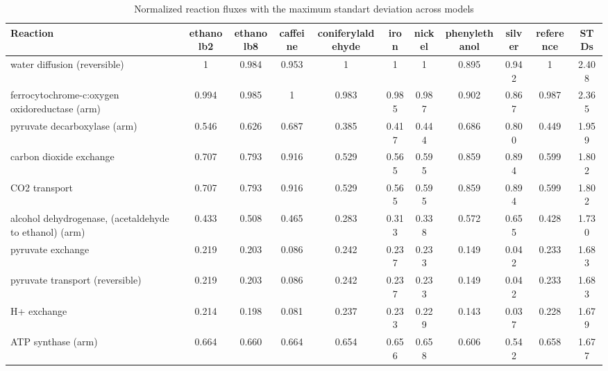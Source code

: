 \begin{longtable}{|l|c|c|c|c|c|c|c|c|c|c|}
    \caption[Common upregulated and downregulated genes]{Normalized reaction fluxes with the maximum standart deviation across models}
\hline
Reaction                                                   & ethanolb2 & ethanolb8 & caffeine & coniferylaldehyde & iron  & nickel & phenylethanol & silver & reference & STDs  \\ \hline
\endhead
%
water diffusion (reversible)                               & 1         & 0.984     & 0.953    & 1                 & 1     & 1      & 0.895         & 0.942  & 1        & 2.408 \\ \hline
ferrocytochrome-c:oxygen oxidoreductase (arm)              & 0.994     & 0.985     & 1        & 0.983             & 0.985 & 0.987  & 0.902         & 0.867  & 0.987    & 2.365 \\ \hline
pyruvate decarboxylase (arm)                               & 0.546     & 0.626     & 0.687    & 0.385             & 0.417 & 0.444  & 0.686         & 0.800  & 0.449    & 1.959 \\ \hline
carbon dioxide exchange                                    & 0.707     & 0.793     & 0.916    & 0.529             & 0.565 & 0.595  & 0.859         & 0.894  & 0.599    & 1.802 \\ \hline
CO2 transport                                              & 0.707     & 0.793     & 0.916    & 0.529             & 0.565 & 0.595  & 0.859         & 0.894  & 0.599    & 1.802 \\ \hline
alcohol dehydrogenase, (acetaldehyde to ethanol) (arm)     & 0.433     & 0.508     & 0.465    & 0.283             & 0.313 & 0.338  & 0.572         & 0.655  & 0.428    & 1.730 \\ \hline
pyruvate exchange                                          & 0.219     & 0.203     & 0.086    & 0.242             & 0.237 & 0.233  & 0.149         & 0.042  & 0.233    & 1.683 \\ \hline
pyruvate transport (reversible)                            & 0.219     & 0.203     & 0.086    & 0.242             & 0.237 & 0.233  & 0.149         & 0.042  & 0.233    & 1.683 \\ \hline
H+ exchange                                                & 0.214     & 0.198     & 0.081    & 0.237             & 0.233 & 0.229  & 0.143         & 0.037  & 0.228    & 1.679 \\ \hline
ATP synthase (arm)                                         & 0.664     & 0.660     & 0.664    & 0.654             & 0.656 & 0.658  & 0.606         & 0.542  & 0.658    & 1.677 \\ \hline

\end{longtable}
